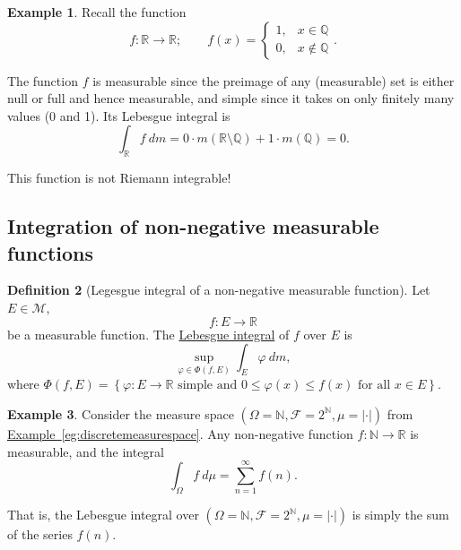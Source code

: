 \documentclass[a4paper,12pt]{scrreprt}
\newcommand{\R}{\mathbb{R}}
\newcommand{\Q}{\mathbb{Q}}
\newcommand{\N}{\mathbb{N}}
\newcommand{\defn}[1]{\ul{#1}}
\newcommand{\abs}[1]{\left|#1\right|}
\theoremstyle{definition}
\newtheorem{definition}{Definition}
\newtheorem{example}[definition]{Example}
\theoremstyle{plain}
\theoremstyle{remark}
\begin{document}
\begin{example}
  Recall the function
  \begin{equation*}
    f\colon \R \to \R;\qquad f(x) =
    \begin{cases}
      1, &x \in \Q \\
      0, &x \notin \Q
    \end{cases}.
  \end{equation*}

  The function $f$ is measurable since the preimage of any (measurable) set is either null or full and hence measurable, and simple since it takes on only finitely many values (0 and 1). Its Lebesgue integral is
  \begin{equation*}
    \int_{\R} f\ dm = 0\cdot m(\R \setminus \Q) + 1 \cdot m(\Q) = 0.
  \end{equation*}

  This function is not Riemann integrable!
\end{example}

\subsection{Integration of non-negative measurable functions}
\begin{definition}[Legesgue integral of a non-negative measurable function]
  \label{def:lebesgueintegralofnonnegativemeasurablefunction}
  Let $E \in \mathcal{M}$, 
  \begin{equation*}
    f\colon E \to \R
  \end{equation*}
  be a measurable function. The \defn{Lebesgue integral} of $f$ over $E$ is
  \begin{equation*}
    \sup_{\varphi \in \Phi(f, E)} \int_{E} \varphi\ dm,
  \end{equation*}
  where $\Phi(f, E) = \left\{ \varphi\colon E \to \R \text{ simple and }0 \leq \varphi(x) \leq f(x)\text{ for all }x \in E \right\}$.
\end{definition}

\begin{example}
  \label{eg:lebesgueintegralcanbesum}
  Consider the measure space $(\Omega = \N, \mathcal{F} = 2^{\N}, \mu = \abs{\cdot})$ from \hyperref[eg:discretemeasurespace]{Example~\ref*{eg:discretemeasurespace}}. Any non-negative function $f\colon \N \to \R$ is measurable, and the integral
  \begin{equation*}
    \int_{\Omega} f\ d\mu = \sum_{n = 1}^{\infty} f(n).
  \end{equation*}

  That is, the Lebesgue integral over $(\Omega = \N, \mathcal{F} = 2^{\N}, \mu = \abs{\cdot})$ is simply the sum of the series $f(n)$.
\end{example}
\end{document}
